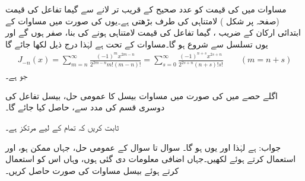 مساوات  میں  کی قیمت کو عدد صحیح کے قریب تر لانے سے گیما تفاعل کی قیمت (صفحہ  پر شکل ) لامتناہی کی طرف بڑھتی ہے۔یوں  کی صورت میں مساوات  کے ابتدائی  ارکان کے  ضریب ، گیما تفاعل کی قیمت لامتناہی ہونے کی بنا، صفر ہوں گے اور یوں تسلسل  سے شروع ہو گا۔مساوات  کے تحت  ہے لہٰذا درج ذیل لکھا جائے گا
\begin{align*}
J_{-n}(x)=\sum_{m=n}^{\infty}\frac{(-1)^mx^{2m-n}}{2^{2m-n}m!(m-n)!}=\sum_{s=0}^{\infty}\frac{(-1)^{n+s}x^{2s+n}}{2^{2s+n} (n+s)!s!}\quad \quad (m=n+s)
\end{align*}
جو  ہے۔

اگلے حصے میں  کی صورت میں مساوات بیسل کا عمومی حل، بیسل تفاعل کی دوسری قسم  کی مدد سے، حاصل کیا جائے گا۔


ثابت کریں کہ  تمام  کے لیے مرتکز ہے۔

جواب:  ہے لہٰذا 
 اور یوں  ہو گا۔
سوال  تا سوال  کے عمومی حل، جہاں ممکن ہو،   اور  استعمال کرتے ہوئے لکھیں۔جہاں اضافی معلومات دی گئی ہوں، وہاں اس کو استعمال کرتے ہوئے بیسل مساوات کی صورت حاصل کریں۔

